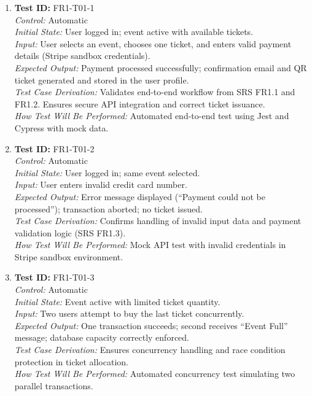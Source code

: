 \documentclass[12pt, titlepage]{article}
\begin{document}
\begin{enumerate}\setlength{\itemsep}{1em}
    \item \textbf{Test ID:} FR1-T01-1\\[0.5em]
    \textit{Control:} Automatic\\[0.3em]
    \textit{Initial State:} User logged in; event active with available tickets.\\[0.3em]
    \textit{Input:} User selects an event, chooses one ticket, and enters valid payment details (Stripe sandbox credentials).\\[0.3em]
    \textit{Expected Output:} Payment processed successfully; confirmation email and QR ticket generated and stored in the user profile.\\[0.3em]
    \textit{Test Case Derivation:} Validates end-to-end workflow from SRS FR1.1 and FR1.2. Ensures secure API integration and correct ticket issuance.\\[0.3em]
    \textit{How Test Will Be Performed:} Automated end-to-end test using Jest and Cypress with mock data.

    \item \textbf{Test ID:} FR1-T01-2\\[0.5em]
    \textit{Control:} Automatic\\[0.3em]
    \textit{Initial State:} User logged in; same event selected.\\[0.3em]
    \textit{Input:} User enters invalid credit card number.\\[0.3em]
    \textit{Expected Output:} Error message displayed (“Payment could not be processed”); transaction aborted; no ticket issued.\\[0.3em]
    \textit{Test Case Derivation:} Confirms handling of invalid input data and payment validation logic (SRS FR1.3).\\[0.3em]
    \textit{How Test Will Be Performed:} Mock API test with invalid credentials in Stripe sandbox environment.

    \item \textbf{Test ID:} FR1-T01-3\\[0.5em]
    \textit{Control:} Automatic\\[0.3em]
    \textit{Initial State:} Event active with limited ticket quantity.\\[0.3em]
    \textit{Input:} Two users attempt to buy the last ticket concurrently.\\[0.3em]
    \textit{Expected Output:} One transaction succeeds; second receives “Event Full” message; database capacity correctly enforced.\\[0.3em]
    \textit{Test Case Derivation:} Ensures concurrency handling and race condition protection in ticket allocation.\\[0.3em]
    \textit{How Test Will Be Performed:} Automated concurrency test simulating two parallel transactions.


\end{enumerate}
\end{document}
